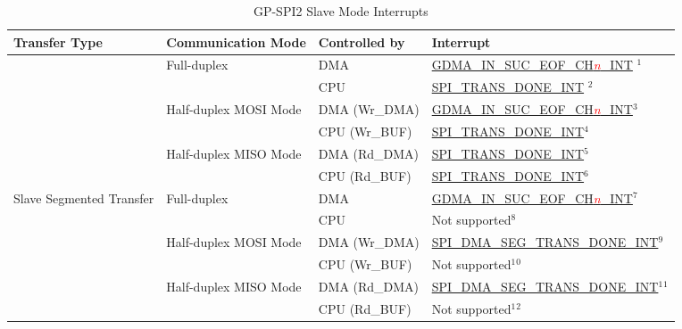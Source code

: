 \documentclass[main\_\_EN.tex]{subfiles}
\begin{document}
\begin{longtable}[c]{|l|l|l|l|}
\caption{GP-SPI2 Slave Mode Interrupts}\\\hline

\rowcolor{lightgray}
\textbf{Transfer Type}  & \textbf{Communication Mode} & \textbf{Controlled by} & \textbf{Interrupt} \\ \hline
\endhead
\label{tab:spi-gp-spi2-slave-interrupts}
\multirow{6}{*}{Single Transfer} & \multirow{2}{*}{Full-duplex} & DMA & \hyperref[int:GDMAINSUCEOFINT]{GDMA\_IN\_SUC\_EOF\_CH\textcolor{red}{\it{n}}\_INT} \hyperref[other:spi-item-gp-spi2-slave-interrupts-note-1]{$^1$} \\ \cline{3-4}
&& CPU & \hyperref[int:SPITRANSDONEINT]{SPI\_TRANS\_DONE\_INT} \hyperref[other:spi-item-gp-spi2-slave-interrupts-note-2]{$^2$}  \\ \cline{2-4}
& \multirow{2}{*}{Half-duplex MOSI Mode} & DMA (Wr\_DMA) & \hyperref[int:GDMAINSUCEOFINT]{GDMA\_IN\_SUC\_EOF\_CH\textcolor{red}{\it{n}}\_INT}\hyperref[other:spi-item-gp-spi2-slave-interrupts-note-3]{$^3$}\\ \cline{3-4}
&& CPU (Wr\_BUF) & \hyperref[int:SPITRANSDONEINT]{SPI\_TRANS\_DONE\_INT}\hyperref[other:spi-item-gp-spi2-slave-interrupts-note-4]{$^4$}  \\ \cline{2-4}
& \multirow{2}{*}{Half-duplex MISO Mode} & DMA (Rd\_DMA) & \hyperref[int:SPITRANSDONEINT]{SPI\_TRANS\_DONE\_INT}\hyperref[other:spi-item-gp-spi2-slave-interrupts-note-5]{$^5$} \\ \cline{3-4}
&& CPU (Rd\_BUF) & \hyperref[int:SPITRANSDONEINT]{SPI\_TRANS\_DONE\_INT}\hyperref[other:spi-item-gp-spi2-slave-interrupts-note-6]{$^6$} \\ \hline
\multirow{6}{*}{Slave Segmented Transfer} & \multirow{2}{*}{Full-duplex} & DMA & \hyperref[int:GDMAINSUCEOFINT]{GDMA\_IN\_SUC\_EOF\_CH\textcolor{red}{\it{n}}\_INT}\hyperref[other:spi-item-gp-spi2-slave-interrupts-note-7]{$^7$} \\ \cline{3-4}
&& CPU & Not supported\hyperref[other:spi-item-gp-spi2-slave-interrupts-note-8]{$^8$} \\ \cline{2-4}
& \multirow{2}{*}{Half-duplex MOSI Mode} & DMA (Wr\_DMA)  & \hyperref[int:SPIDMASEGTRANSDONEINT]{SPI\_DMA\_SEG\_TRANS\_DONE\_INT}\hyperref[other:spi-item-gp-spi2-slave-interrupts-note-9]{$^9$} \\ \cline{3-4}
&& CPU (Wr\_BUF)           & Not supported\hyperref[other:spi-item-gp-spi2-slave-interrupts-note-10]{$^1$$^0$}       \\ \cline{2-4}
& \multirow{2}{*}{Half-duplex MISO Mode} & DMA (Rd\_DMA) & \hyperref[int:SPIDMASEGTRANSDONEINT]{SPI\_DMA\_SEG\_TRANS\_DONE\_INT}\hyperref[other:spi-item-gp-spi2-slave-interrupts-note-11]{$^1$$^1$} \\ \cline{3-4}
&& CPU (Rd\_BUF) & Not supported\hyperref[other:spi-item-gp-spi2-slave-interrupts-note-12]{$^1$$^2$}       \\ \hline

\end{longtable}
\end{document}
